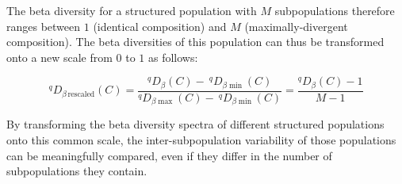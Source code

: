 \noindent The beta diversity for a structured population with $M$ subpopulations therefore ranges between $1$ (identical composition) and $M$ (maximally-divergent composition). The beta diversities of this population can thus be transformed onto a new scale from $0$ to $1$ as follows:

\begin{equation}
^qD_{\beta\,\mathrm{rescaled}}(C) = \frac{^qD_\beta(C) -\:^qD_{\beta\min}(C)}{^qD_{\beta\max}(C) -\: ^qD_{\beta\min}(C)} = \frac{^qD_\beta(C) - 1}{M - 1}
\label{eq:diversity_beta_rescale}
\end{equation}

\noindent By transforming the beta diversity spectra of different structured populations onto this common scale, the inter-subpopulation variability of those populations can be meaningfully compared, even if they differ in the number of subpopulations they contain.